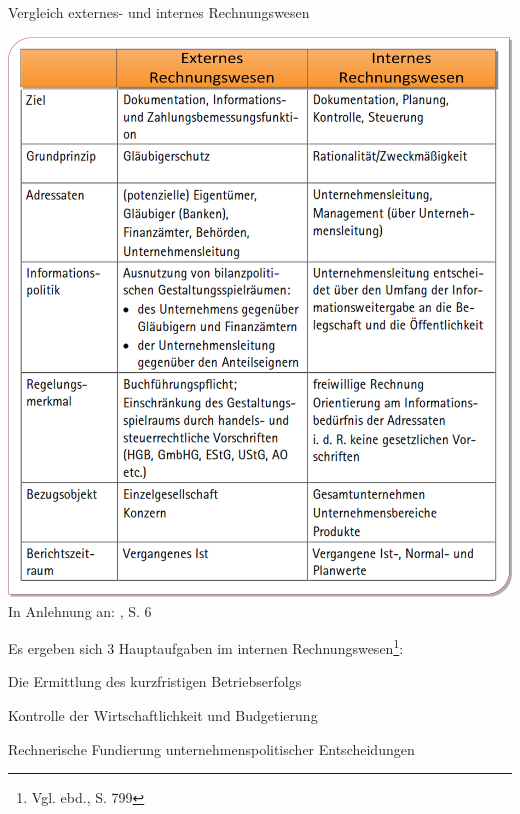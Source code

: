 \begin{table}[htbp]
\begin{center}
\caption[Vergleich externes- und internes Rechnungswesen]{Vergleich externes- und internes Rechnungswesen}
\includegraphics[width=1\textwidth]{Images/VergleichIntExt.png}
\label{abb1}
{\footnotesize In Anlehnung an: \cite{Lojewski2001}, S. 6}
\end{center}
\end{table} 

\noindent Es ergeben sich 3 Hauptaufgaben im internen Rechnungswesen\footnote{Vgl. ebd., S. 799}:
\begin{compactitem}
\item[1] Die Ermittlung des kurzfristigen Betriebserfolgs
\item[2] Kontrolle der Wirtschaftlichkeit und Budgetierung
\item[3] Rechnerische Fundierung unternehmenspolitischer Entscheidungen
\end{compactitem}



